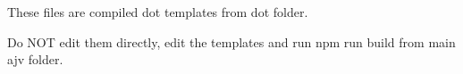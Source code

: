 These files are compiled dot templates from dot folder.

Do NOT edit them directly, edit the templates and run {\ttfamily npm run build} from main ajv folder. 